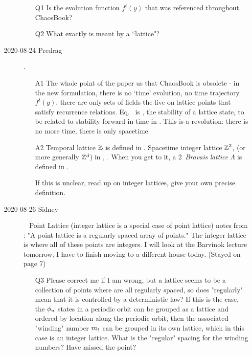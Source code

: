 \begin{description}
\vspace{3mm}

\begin{itemize}
  \item[Q1]
Is  the evolution function $f^t(y)$ that was
referenced throughout ChaosBook?
  \item[Q2]
What exactly is meant by a ``lattice"?
\end{itemize}

\item[2020-08-24 Predrag].

\begin{itemize}
  \item[A1]
The whole point of the paper us that ChaosBook is obsolete - in the new
formulation, there is no `time' evolution, no time trajectory $f^t(y)$,
there are only sets of fields the live on lattice points that satisfy
recurrence relations. Eq.~ is \emph{\jacobianOrb}, the
stability of a lattice state, to be related to stability forward in time
in . This is a revolution: there is no more time, there
is only spacetime.
  \item[A2]
Temporal lattice $\mathbb{Z}$ is defined in . Spacetime
integer lattice $\mathbb{Z}^2$, (or more generally $\mathbb{Z}^d$) in
, .
When you get to it, a 2\dmn\ \emph{Bravais lattice} $\Lambda$ is defined
in .

If this is unclear, read up on integer lattices, give your own precise definition.
\end{itemize}

\item[2020-08-26 Sidney]~
Point Lattice (integer lattice is a special case of point
lattice) notes from
: "A point
lattice is a regularly spaced array of points." The integer lattice is
where all of these points are integers. I will look at the Barvinok
lecture tomorrow, I have to finish moving to a different house today.
(Stayed on page 7)

\begin{itemize}
	\item[Q3]
Please correct me if I am wrong, but a lattice seems to be a collection
of points where are all regularly spaced, so does "regularly" mean that
it is controlled by a deterministic law? If this is the case, the
$\phi_n$ states in a periodic orbit can be grouped as a lattice and
ordered by location along the periodic orbit, then the associated
"winding" number ${m_{t}}$ can be grouped in its own lattice, which in this
case is an integer lattice. What is the "regular" spacing for the winding
numbers? Have missed the point?
\end{itemize}


\end{description}
